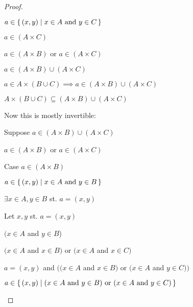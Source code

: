 \documentclass[../../main.tex]{subfiles}
\begin{document}
\begin{enumerate}
\begin{proof}
\begin{lxl}
\begin{lxl}
\begin{lxl}
                        \begin{lxl}
                            \item $a \in \Set{(x,y)}{x \in A$ and $y \in C}$
                            \item $a \in (A \times C)$
                        \end{lxl}
                        \item $a \in (A \times B)$ or $a \in (A \times C)$
                        \item $a \in (A \times B) \cup (A \times C)$
                    \end{lxl}
                \end{lxl}
                \item $a \in A \times (B \cup C) \implies a \in (A \times B) \cup (A \times C)$
                \item $A \times (B \cup C) \subseteq (A \times B) \cup (A \times C)$
            \end{lxl}
            \item Now this is mostly invertible:
            \begin{lxl}[resume]
                \item Suppose $a \in (A \times B) \cup (A \times C)$
                \begin{lxl}
                    \item $a \in (A \times B)$ or $a \in (A \times C)$
                    \item Case $a \in (A \times B)$
                    \begin{lxl}
                        \item $a \in \Set{(x,y)}{x \in A$ and $y \in B}$
                        \item $\exists x \in A, y \in B $ st. $a = (x,y)$
                        \item Let $x, y$ st. $a = (x,y)$
                        \begin{lxl}
                            \item $(x \in A$ and $y \in B$)
                            \item $(x \in A$ and $x \in B)$ or $(x \in A$ and $x \in C)$
                            \item $a = (x,y)$ and $\bigl( (x \in A$ and $x \in B)$ or $(x \in A$ and $y \in C) \bigr)$
                            \item $a \in \Set{(x,y)}{(x \in A$ and $y \in B)$ or $(x \in A$ and $y \in C)}$


\end{lxl}
\end{lxl}
\end{lxl}
\end{lxl}
\end{proof}
\end{enumerate}
\end{document}
